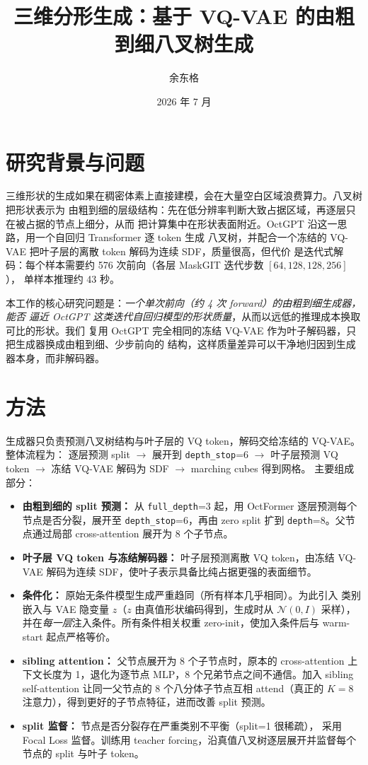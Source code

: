 \documentclass{article}
\title{三维分形生成：基于 VQ-VAE 的由粗到细八叉树生成}
\author{余东格}
\date{2026 年 7 月}
\begin{document}
\maketitle

\section{研究背景与问题}
三维形状的生成如果在稠密体素上直接建模，会在大量空白区域浪费算力。八叉树把形状表示为
由粗到细的层级结构：先在低分辨率判断大致占据区域，再逐层只在被占据的节点上细分，从而
把计算集中在形状表面附近。OctGPT 沿这一思路，用一个自回归 Transformer 逐 token 生成
八叉树，并配合一个冻结的 VQ-VAE 把叶子层的离散 token 解码为连续 SDF，质量很高，但代价
是迭代式解码：每个样本需要约 576 次前向（各层 MaskGIT 迭代步数 $[64,128,128,256]$），
单样本推理约 43 秒。

本工作的核心研究问题是：\emph{一个单次前向（约 4 次 forward）的由粗到细生成器，能否
逼近 OctGPT 这类迭代自回归模型的形状质量}，从而以远低的推理成本换取可比的形状。我们
复用 OctGPT 完全相同的冻结 VQ-VAE 作为叶子解码器，只把生成器换成由粗到细、少步前向的
结构，这样质量差异可以干净地归因到生成器本身，而非解码器。

\section{方法}
生成器只负责预测八叉树结构与叶子层的 VQ token，解码交给冻结的 VQ-VAE。整体流程为：
逐层预测 split $\rightarrow$ 展开到 \texttt{depth\_stop}=6 $\rightarrow$ 叶子层预测
VQ token $\rightarrow$ 冻结 VQ-VAE 解码为 SDF $\rightarrow$ marching cubes 得到网格。
主要组成部分：

\begin{itemize}
    \item \textbf{由粗到细的 split 预测：} 从 \texttt{full\_depth}=3 起，用 OctFormer
    逐层预测每个节点是否分裂，展开至 \texttt{depth\_stop}=6，再由 zero split 扩到
    \texttt{depth}=8。父节点通过局部 cross-attention 展开为 8 个子节点。
    \item \textbf{叶子层 VQ token 与冻结解码器：} 叶子层预测离散 VQ token，由冻结
    VQ-VAE 解码为连续 SDF，使叶子表示具备比纯占据更强的表面细节。
    \item \textbf{条件化：} 原始无条件模型生成严重趋同（所有样本几乎相同）。为此引入
    类别嵌入与 VAE 隐变量 $z$（$z$ 由真值形状编码得到，生成时从 $\mathcal{N}(0,I)$
    采样），并在\emph{每一层}注入条件。所有条件相关权重 zero-init，使加入条件后与
    warm-start 起点严格等价。
    \item \textbf{sibling attention：} 父节点展开为 8 个子节点时，原本的
    cross-attention 上下文长度为 1，退化为逐节点 MLP，8 个兄弟节点之间不通信。加入
    sibling self-attention 让同一父节点的 8 个八分体子节点互相 attend（真正的 $K=8$
    注意力），得到更好的子节点特征，进而改善 split 预测。
    \item \textbf{split 监督：} 节点是否分裂存在严重类别不平衡（split=1 很稀疏），
    采用 Focal Loss 监督。训练用 teacher forcing，沿真值八叉树逐层展开并监督每个
    节点的 split 与叶子 token。
\end{itemize}
\end{document}
